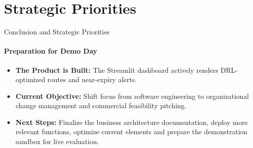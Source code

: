 \documentclass{beamer}
\begin{document}
\section{Strategic Priorities}

\begin{frame}{Conclusion and Strategic Priorities}
  \framesubtitle{Preparation for Demo Day}
  
  \begin{itemize}
      \item \textbf{The Product is Built:} The Streamlit dashboard actively renders DRL-optimized routes and near-expiry alerts.
      \item \textbf{Current Objective:} Shift focus from software engineering to organizational change management and commercial feasibility pitching.
      \item \textbf{Next Steps:} Finalize the business architecture documentation, deploy more relevant functions, optimize current elements and prepare the demonstration sandbox for live evaluation.
  \end{itemize}
\end{frame}
\end{document}
